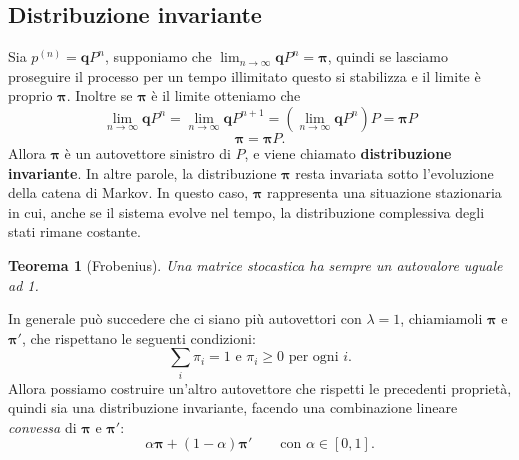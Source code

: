 \documentclass{article}
\newtheorem{theorem}{Teorema}[section]
\theoremstyle{definition}
\theoremstyle{remark}
\begin{document}
\subsection{Distribuzione invariante}
Sia $p^{(n)} = \boldsymbol{q}P^n$, supponiamo che $\lim_{n\to\infty}\boldsymbol{q}P^n = \boldsymbol{\pi} $, quindi se lasciamo proseguire il processo
per un tempo illimitato questo si stabilizza e il limite è proprio $\boldsymbol{\pi}$. Inoltre se $\boldsymbol{\pi}$ è il limite otteniamo che
$$\lim_{n\to \infty} \boldsymbol{q}P^n = \lim_{n\to \infty} \boldsymbol{q}P^{n+1} = (\lim_{n\to \infty} \boldsymbol{q}P^n)P = \boldsymbol{\pi} P$$
$$\boldsymbol{\pi}=\boldsymbol{\pi} P.$$
Allora $\boldsymbol{\pi}$ è un autovettore sinistro di $P$, e viene chiamato \textbf{distribuzione invariante}. In altre parole,
la distribuzione $\boldsymbol{\pi}$ resta invariata sotto l'evoluzione della catena di Markov. In questo caso, $\boldsymbol{\pi}$ rappresenta una situazione stazionaria in cui, anche se il sistema evolve nel tempo,
la distribuzione complessiva degli stati rimane costante.
\begin{theorem}[Frobenius]
    Una matrice \textit{stocastica} ha sempre un autovalore uguale ad 1.
\end{theorem}
In  generale può succedere che ci siano più autovettori con $\lambda = 1$, chiamiamoli $\boldsymbol{\pi}$ e $\boldsymbol{\pi}'$, che rispettano le seguenti condizioni:
$$ \sum_i \pi_i = 1 \text{ e }\pi_i\ge 0 \text{ per ogni $i$.}$$
Allora possiamo costruire un'altro autovettore che rispetti le precedenti proprietà, quindi sia una distribuzione invariante, facendo una combinazione lineare \textit{convessa} di $\boldsymbol{\pi}$ e $\boldsymbol{\pi}'$:
$$\alpha\boldsymbol{\pi} + (1-\alpha)\boldsymbol{\pi'}\qquad \text{con $\alpha \in [0,1]$.}$$
\end{document}
